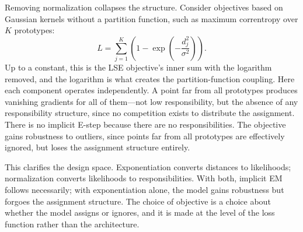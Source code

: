 Removing normalization collapses the structure. Consider objectives based on Gaussian kernels without a partition function, such as maximum correntropy over $K$ prototypes:
\[
L = \sum_{j=1}^{K} \left( 1 - \exp\!\left( -\frac{d_j^2}{\sigma^2} \right) \right).
\]
Up to a constant, this is the LSE objective's inner sum with the logarithm removed, and the logarithm is what creates the partition-function coupling. Here each component operates independently. A point far from all prototypes produces vanishing gradients for all of them---not low responsibility, but the absence of any responsibility structure, since no competition exists to distribute the assignment. There is no implicit E-step because there are no responsibilities. The objective gains robustness to outliers, since points far from all prototypes are effectively ignored, but loses the assignment structure entirely.

This clarifies the design space. Exponentiation converts distances to likelihoods; normalization converts likelihoods to responsibilities. With both, implicit EM follows necessarily; with exponentiation alone, the model gains robustness but forgoes the assignment structure. The choice of objective is a choice about whether the model assigns or ignores, and it is made at the level of the loss function rather than the architecture.
